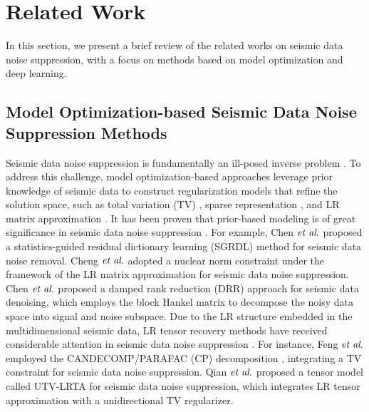\section{Related Work}
\label{sec:2}
In this section, we present a brief review of the related works on seismic data noise suppression, with a focus on methods based on model optimization and deep learning.

\subsection{Model Optimization-based Seismic Data Noise Suppression Methods}

Seismic data noise suppression is fundamentally an ill-posed inverse problem \cite{qian2023improved,wang2015improved,li2022simultaneous}. To address this challenge, model optimization-based approaches leverage prior knowledge of seismic data to construct regularization models that refine the solution space, such as total variation (TV) \cite{osher2005iterative}, sparse representation \cite{aharon2006k}, and LR matrix approximation \cite{cai2010singular}. It has been proven that prior-based modeling is of great significance in seismic data noise suppression \cite{chen2021statistics,cheng2015application,chen2016simultaneous,qian2023improved,liu2024simultaneous}. For example, Chen $\emph{et al}.$ \cite{chen2021statistics} proposed a statistics-guided residual dictionary learning (SGRDL) method for seismic data noise removal. Cheng $\emph{et al}.$ \cite{cheng2015application} adopted a nuclear norm constraint under the framework of the LR matrix approximation for seismic data noise suppression. Chen $\emph{et al}.$ \cite{chen2016simultaneous} proposed a damped rank reduction (DRR) approach for seismic data denoising, which employs the block Hankel matrix to decompose the noisy data space into signal and noise subspace. Due to the LR structure embedded in the multidimensional seismic data, LR tensor recovery methods have received considerable attention in seismic data noise suppression \cite{feng2021low,feng2021seismic,qian2023improved,liu2024simultaneous}. For instance, Feng $\emph{et al}.$ \cite{feng2021seismic} employed the CANDECOMP/PARAFAC (CP) decomposition \cite{carroll1970analysis}, integrating a TV constraint for seismic data noise suppression. Qian $\emph{et al}.$ \cite{qian2023improved} proposed a tensor model called UTV-LRTA for seismic data noise suppression, which integrates LR tensor approximation with a unidirectional TV regularizer.


